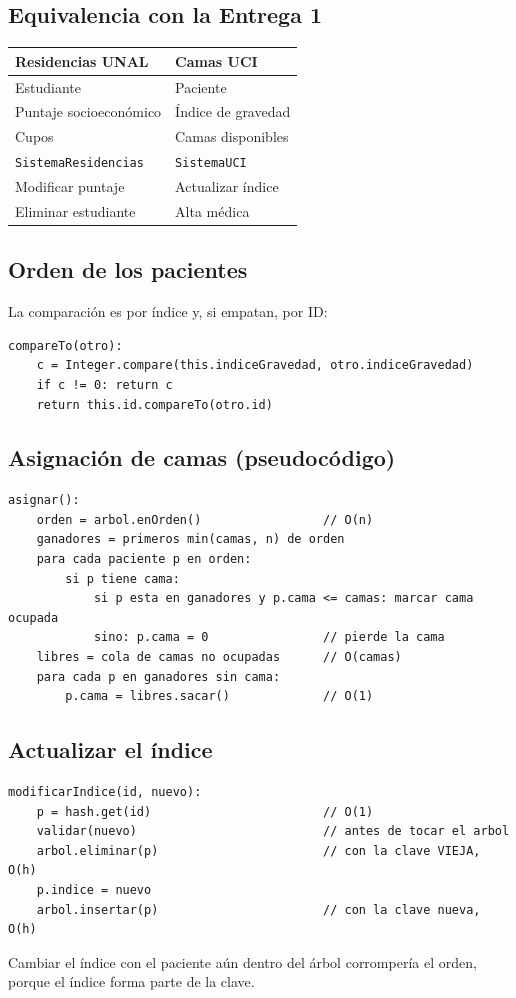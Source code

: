 \documentclass[11pt,a4paper]{article}
\begin{document}
\subsection{Equivalencia con la Entrega 1}
\begin{tabular}{@{}ll@{}}
\toprule \textbf{Residencias UNAL} & \textbf{Camas UCI}\\ \midrule
Estudiante & Paciente\\
Puntaje socioeconómico & Índice de gravedad\\
Cupos & Camas disponibles\\
\texttt{SistemaResidencias} & \texttt{SistemaUCI}\\
Modificar puntaje & Actualizar índice\\
Eliminar estudiante & Alta médica\\
\bottomrule
\end{tabular}

\subsection{Orden de los pacientes}
La comparación es por índice y, si empatan, por ID:
\begin{lstlisting}
compareTo(otro):
    c = Integer.compare(this.indiceGravedad, otro.indiceGravedad)
    if c != 0: return c
    return this.id.compareTo(otro.id)
\end{lstlisting}

\subsection{Asignación de camas (pseudocódigo)}
\begin{lstlisting}
asignar():
    orden = arbol.enOrden()                 // O(n)
    ganadores = primeros min(camas, n) de orden
    para cada paciente p en orden:
        si p tiene cama:
            si p esta en ganadores y p.cama <= camas: marcar cama ocupada
            sino: p.cama = 0                // pierde la cama
    libres = cola de camas no ocupadas      // O(camas)
    para cada p en ganadores sin cama:
        p.cama = libres.sacar()             // O(1)
\end{lstlisting}
\subsection{Actualizar el índice}
\begin{lstlisting}
modificarIndice(id, nuevo):
    p = hash.get(id)                        // O(1)
    validar(nuevo)                          // antes de tocar el arbol
    arbol.eliminar(p)                       // con la clave VIEJA, O(h)
    p.indice = nuevo
    arbol.insertar(p)                       // con la clave nueva, O(h)
\end{lstlisting}
Cambiar el índice con el paciente aún dentro del árbol corrompería el orden, porque el índice forma parte de la clave.
\end{document}
